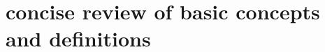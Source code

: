 \ifx\allfiles\undefined
{}  %
\usepackage[dvipsnames]{xcolor}
\usepackage{amsmath}   %
\usepackage{graphicx}
\usetikzlibrary{arrows, calc, decorations.pathmorphing}
\allowdisplaybreaks %
\newcommand{\pa}{\partial}
\newcommand{\mathminus}{\!\!-\!\!} %
\newcommand{\vsup}[1]{\raisebox{-0.1ex}{$\scriptstyle #1$}}
\newcommand{\lsup}[1]{\raisebox{-0.85ex}{$\scriptstyle #1$}}




\else
\fi
\chapter{concise review of basic concepts and definitions}
